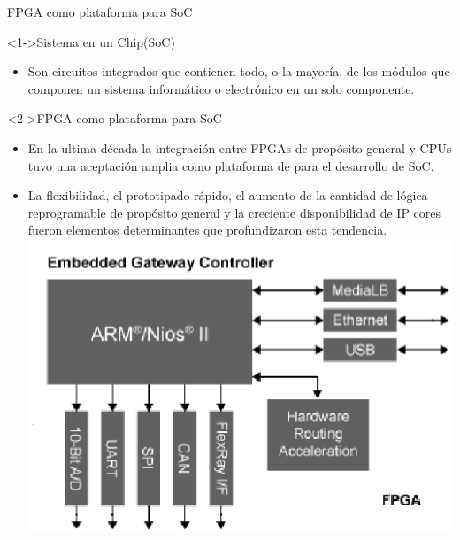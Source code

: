 \documentclass[xcolor=dvipsnames]{beamer}
\begin{document}
\begin{frame}{FPGA como plataforma para SoC}
  \begin{block}<1->{Sistema en un Chip(SoC)} 
    \begin{itemize}
      \scriptsize
      \item Son circuitos integrados que contienen todo, o la mayoría, de los módulos que componen un sistema informático o electrónico en un solo componente.
    \end{itemize}      
  \end{block}

  \begin{block}<2->{FPGA como plataforma para SoC} 
    \begin{itemize}
      \scriptsize
      \item En la ultima década la integración entre FPGAs de propósito general y CPUs tuvo una aceptación amplia como plataforma de para el desarrollo de SoC.    
	\item La flexibilidad, el prototipado rápido, el aumento de la cantidad de lógica reprogramable de propósito general y la creciente disponibilidad de IP cores fueron elementos determinantes que profundizaron esta tendencia.
	\center
        \includegraphics[scale=0.29]{figures/soc2.eps} 

    \end{itemize}      
  \end{block}
\end{frame}
\end{document}
